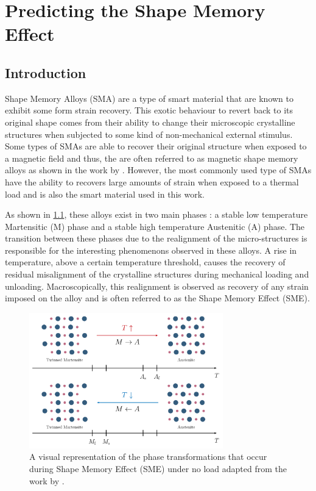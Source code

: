 
\chapter{Predicting the Shape Memory Effect}\label{chap:sma-model}
\section{Introduction}
Shape Memory Alloys (SMA) are a type of smart material that are known to exhibit some form strain recovery. This exotic behaviour to revert back to its original shape comes from their ability to change their microscopic crystalline structures when subjected to some kind of non-mechanical external stimulus. Some types of SMAs are able to recover their original structure when exposed to a magnetic field and thus, the are often referred to as magnetic shape memory alloys as shown in the work by \cite{faranFerromagneticShapeMemory2016}. However, the most commonly used type of SMAs have the ability to recovers large amounts of strain when exposed to a thermal load and is also the smart material used in this work.

As shown in \cref{fig:sma-phase-transformations}, these alloys exist in two main phases : a stable low temperature Martensitic (M) phase and a stable high temperature Austenitic (A) phase. The transition between these phases due to the realignment of the micro-structures is responsible for the interesting phenomenons observed in these alloys. A rise in temperature, above a certain temperature threshold, causes the recovery of residual misalignment of the crystalline structures during mechanical loading and unloading. Macroscopically, this realignment is observed as recovery of any strain imposed on the alloy and is often referred to as the Shape Memory Effect (SME).

\begin{figure}[hbt]
    \centering
    \includegraphics[width=0.75\textwidth]{images/chap2/sma-phase-transformations.pdf}
    \caption{A visual representation of the phase transformations that occur during Shape Memory Effect (SME) under no load adapted from the work by \cite{raoDesignShapeMemory2015}.}
    \label{fig:sma-phase-transformations}
\end{figure}

